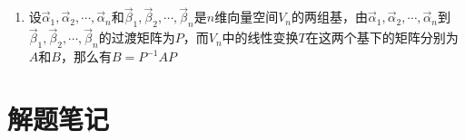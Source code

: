 \documentclass[12pt,a4paper,UTF8]{book}
\begin{document}
\begin{enumerate}
\[\begin{aligned}
&\cdots\cdots\\
&T\left(\vec{\alpha}_n\right)=p_{n1}\vec{\alpha}_1+p_{n2}\vec{\alpha}_2+\cdots+p_{nn}\vec{\alpha}_n
\end{aligned}\right.\]
将上述线性方程组的系数矩阵的转置（注意，跟上面的坐标变换一样，都是转置）记为$A$
\[A=\begin{bmatrix}p_{11}&p_{21}&\cdots&p_{n1}\\p_{12}&p_{22}&\cdots&p_{n2}\\\vdots&\vdots&\quad&\vdots\\p_{1n}&p_{2n}&\cdots&p_{nn}\end{bmatrix}\]
则线性变换$T$可以表示为
\[T\left(\vec{\alpha}_1,\vec{\alpha}_2,\cdots,\vec{\alpha}_n\right)=\left(\vec{\alpha}_1,\vec{\alpha}_2,\cdots,\vec{\alpha}_n\right)A\]
$A$就称为线性变换$T$在基$\vec{\alpha}_1,\vec{\alpha}_2,\cdots,\vec{\alpha}_n$下的矩阵，该矩阵在线性变换和基都确定的情况下唯一
\item 设$\vec{\alpha}_1,\vec{\alpha}_2,\cdots,\vec{\alpha}_n$和$\vec{\beta}_1,\vec{\beta}_2,\cdots,\vec{\beta}_n$是$n$维向量空间$V_n$的两组基，由$\vec{\alpha}_1,\vec{\alpha}_2,\cdots,\vec{\alpha}_n$到$\vec{\beta}_1,\vec{\beta}_2,\cdots,\vec{\beta}_n$的过渡矩阵为$P$，而$V_n$中的线性变换$T$在这两个基下的矩阵分别为$A$和$B$，那么有$B=P^{-1}AP$
\end{enumerate}





\chapter{解题笔记}
\end{document}
